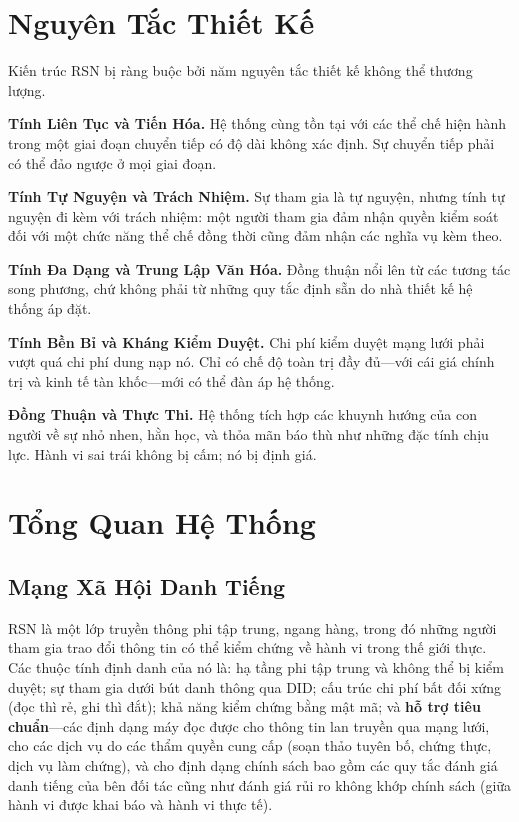 \documentclass[11pt,a4paper,twocolumn]{article}
\begin{document}
\section{Nguyên Tắc Thiết Kế}

Kiến trúc RSN bị ràng buộc bởi năm nguyên tắc thiết kế không thể thương lượng.

\textbf{Tính Liên Tục và Tiến Hóa.} Hệ thống cùng tồn tại với các thể chế hiện hành trong một giai đoạn chuyển tiếp có độ dài không xác định. Sự chuyển tiếp phải có thể đảo ngược ở mọi giai đoạn.

\textbf{Tính Tự Nguyện và Trách Nhiệm.} Sự tham gia là tự nguyện, nhưng tính tự nguyện đi kèm với trách nhiệm: một người tham gia đảm nhận quyền kiểm soát đối với một chức năng thể chế đồng thời cũng đảm nhận các nghĩa vụ kèm theo.

\textbf{Tính Đa Dạng và Trung Lập Văn Hóa.} Đồng thuận nổi lên từ các tương tác song phương, chứ không phải từ những quy tắc định sẵn do nhà thiết kế hệ thống áp đặt.

\textbf{Tính Bền Bỉ và Kháng Kiểm Duyệt.} Chi phí kiểm duyệt mạng lưới phải vượt quá chi phí dung nạp nó. Chỉ có chế độ toàn trị đầy đủ---với cái giá chính trị và kinh tế tàn khốc---mới có thể đàn áp hệ thống.

\textbf{Đồng Thuận và Thực Thi.} Hệ thống tích hợp các khuynh hướng của con người về sự nhỏ nhen, hằn học, và thỏa mãn báo thù như những đặc tính chịu lực. Hành vi sai trái không bị cấm; nó bị định giá.

\section{Tổng Quan Hệ Thống}

\subsection{Mạng Xã Hội Danh Tiếng}

RSN là một lớp truyền thông phi tập trung, ngang hàng, trong đó những người tham gia trao đổi thông tin có thể kiểm chứng về hành vi trong thế giới thực. Các thuộc tính định danh của nó là: hạ tầng phi tập trung và không thể bị kiểm duyệt; sự tham gia dưới bút danh thông qua DID; cấu trúc chi phí bất đối xứng (đọc thì rẻ, ghi thì đắt); khả năng kiểm chứng bằng mật mã; và \textbf{hỗ trợ tiêu chuẩn}---các định dạng máy đọc được cho thông tin lan truyền qua mạng lưới, cho các dịch vụ do các thẩm quyền cung cấp (soạn thảo tuyên bố, chứng thực, dịch vụ làm chứng), và cho định dạng chính sách bao gồm các quy tắc đánh giá danh tiếng của bên đối tác cũng như đánh giá rủi ro không khớp chính sách (giữa hành vi được khai báo và hành vi thực tế).
\end{document}
